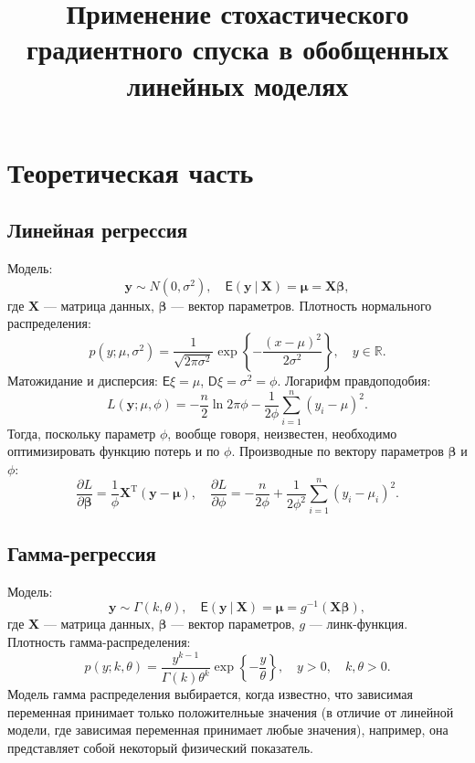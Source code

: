 \documentclass[a4paper]{article}
\title{Применение стохастического градиентного спуска в обобщенных линейных моделях}
\date{}
\begin{document}
\maketitle


\section{Теоретическая часть}
\subsection{Линейная регрессия}
Модель:
\[
    \mathbf{y}\sim N(0, \sigma^2),\quad \mathsf{E}(\mathbf{y}~|~\mathbf{X})=\bm\mu=\mathbf{X} \bm\beta,
\]
где $\mathbf{X}$ — матрица данных, $\boldsymbol\beta$ — вектор параметров. Плотность нормального распределения:
\[
    p(y; \mu, \sigma^2)=\frac1{\sqrt{2\pi\sigma^2}}\exp\left\{-\frac{(x-\mu)^2}{2\sigma^2}\right\},\quad y\in \mathbb{R}.
\]
Матожидание и дисперсия: $\mathsf E \xi = \mu$, $\mathsf D \xi=\sigma^2=\phi$. Логарифм правдоподобия:
\[
    L(\mathbf{y}; \mu, \phi)=-\frac{n}{2}\ln2\pi\phi-\frac{1}{2\phi}\sum_{i=1}^n(y_i-\mu)^2.
\]
Тогда, поскольку параметр $\phi$, вообще говоря, неизвестен, необходимо оптимизировать функцию потерь и по $\phi$. Производные по вектору параметров $\bm\beta$ и $\phi$:
\[
    \frac{\partial L}{\partial\bm\beta}=\frac1\phi\mathbf{X}^\mathrm{T}(\mathbf{y}-\bm\mu),\quad \frac{\partial L}{\partial \phi}=-\frac{n}{2\phi} + \frac{1}{2\phi^2}\sum_{i=1}^n(y_i-\mu_i)^2.
\]

\subsection{Гамма-регрессия}
Модель:
\[
    \mathbf{y}\sim\Gamma(k, \theta), \quad \mathsf{E}(\mathbf y~|~ \mathbf{X})=\bm\mu=g^{-1}(\mathbf{X}\bm{\beta}),
\]
где $\mathbf{X}$ — матрица данных, $\boldsymbol\beta$ — вектор параметров, $g$ --- линк-функция.
Плотность гамма-распределения:
\[
    p(y; k, \theta) = \frac{y^{k-1}}{\Gamma(k)\theta^k}\exp\left\{-\frac{y}{\theta}\right\},\quad y > 0,\quad k, \theta > 0.
\]
Модель гамма распределения выбирается, когда известно, что зависимая переменная принимает только положителньые значения (в отличие от линейной модели, где зависимая переменная принимает любые значения), например, она представляет собой некоторый физический показатель. 
\end{document}
